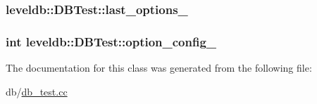 \hypertarget{classleveldb_1_1_d_b_test_adc05df912917d8de411d0672af04330f}{
\subsubsection[{last\-\_\-options\-\_\-}]{ leveldb\-::\-D\-B\-Test\-::last\-\_\-options\-\_\-}}\label{classleveldb_1_1_d_b_test_adc05df912917d8de411d0672af04330f}
\hypertarget{classleveldb_1_1_d_b_test_a3cc39d9674e4e47e2be82b023f791bd0}{
\subsubsection[{option\-\_\-config\-\_\-}]{\setlength{\rightskip}{0pt plus 5cm}int leveldb\-::\-D\-B\-Test\-::option\-\_\-config\-\_\-\hspace{0.3cm}{\ttfamily [private]}}}\label{classleveldb_1_1_d_b_test_a3cc39d9674e4e47e2be82b023f791bd0}


The documentation for this class was generated from the following file\-:\begin{DoxyCompactItemize}
\item 
db/\hyperlink{db__test_8cc}{db\-\_\-test.\-cc}\end{DoxyCompactItemize}
